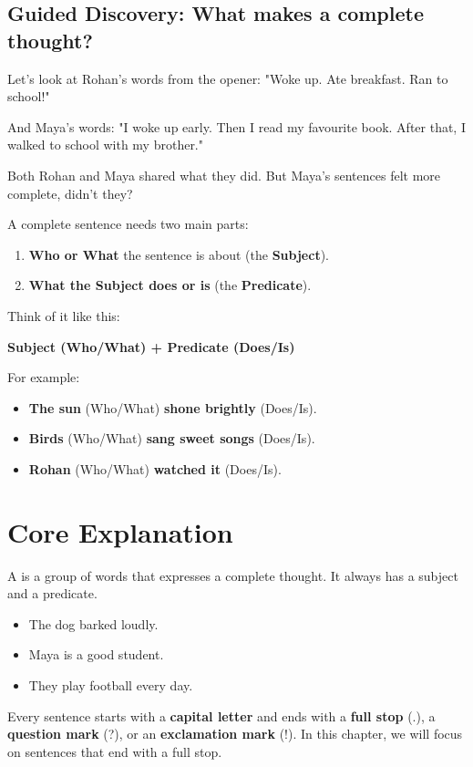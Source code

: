 \subsection*{Guided Discovery: What makes a complete thought?}
Let's look at Rohan's words from the opener: "Woke up. Ate breakfast. Ran to school!"

And Maya's words: "I woke up early. Then I read my favourite book. After that, I walked to school with my brother."

Both Rohan and Maya shared what they did. But Maya's sentences felt more complete, didn't they?

A complete sentence needs two main parts:
\begin{enumerate}
    \item \textbf{Who or What} the sentence is about (the \textbf{Subject}).
    \item \textbf{What the Subject does or is} (the \textbf{Predicate}).
\end{enumerate}

Think of it like this:

\textbf{Subject (Who/What) + Predicate (Does/Is)}

For example:
\begin{itemize}
    \item \textbf{The sun} (Who/What) \textbf{shone brightly} (Does/Is).
    \item \textbf{Birds} (Who/What) \textbf{sang sweet songs} (Does/Is).
    \item \textbf{Rohan} (Who/What) \textbf{watched it} (Does/Is).
\end{itemize}

\section{Core Explanation}
A  is a group of words that expresses a complete thought. It always has a subject and a predicate.

\begin{examplebox}
    \begin{itemize}
        \item The dog barked loudly.
        \item Maya is a good student.
        \item They play football every day.
    \end{itemize}
\end{examplebox}

Every sentence starts with a \textbf{capital letter} and ends with a \textbf{full stop} (.), a \textbf{question mark} (?), or an \textbf{exclamation mark} (!). In this chapter, we will focus on sentences that end with a full stop.

